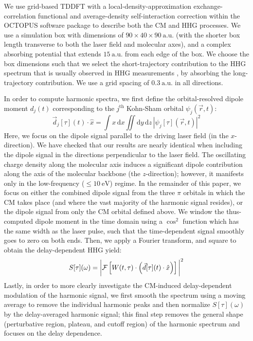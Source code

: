 \documentclass[journal=jacsat,manuscript=article]{achemso}
\begin{document}
We use grid-based TDDFT with a local-density-approximation exchange-correlation functional \cite{perdew1981, yabana1996, marques2012} and average-density self-interaction correction \cite{legrand2002, ciofini2003, tsuneda2014} within the OCTOPUS software package \cite{marques2003, castro2006, andrade2015, tancogne-dejean2020} to describe both the CM and HHG processes. We use a simulation box with dimensions of $90 \times 40 \times 90\  \text{a.u.}$ (with the shorter box length transverse to both the laser field and molecular axes), and a complex absorbing potential that extends $15\  \text{a.u.}$ from each edge of the box. We choose the box dimensions such that we select the short-trajectory contribution to the HHG spectrum that is usually observed in HHG measurements \cite{hamer2021}, by absorbing the long-trajectory contribution. We use a grid spacing of $0.3\  \text{a.u.}$ in all directions. 

In order to compute harmonic spectra, we first define the orbital-resolved dipole moment \cite{hamer2021} $d_{j}(t)$ corresponding to the $j^{\text{th}}$ Kohn-Sham orbital $\psi_{j}(\vec{r}, t)$:
\begin{equation}\label{eq:ordm}
    \vec{d}_{j}[\tau](t) \cdot \hat{x} = \int x\, \mathrm{d}x \iint \mathrm{d}y\, \mathrm{d}z\, |\psi_{j}[\tau](\vec{r}, t)|^{2}
\end{equation}
Here, we focus on the dipole signal parallel to the driving laser field (in the $x$-direction). We have checked that our results are nearly identical when including the dipole signal in the directions perpendicular to the laser field. The oscillating charge density along the molecular axis induces a significant dipole contribution along the axis of the molecular backbone (the $z$-direction); however, it manifests only in the low-frequency ($\leq 10\  \text{eV}$) regime. In the remainder of this paper, we focus on either the combined dipole signal from the three $\pi$ orbitals in which the CM takes place (and where the vast majority of the harmonic signal resides), or the dipole signal from only the CM orbital defined above. We window the thus-computed dipole moment in the time domain using a $\cos^{2}$ function which has the same width as the laser pulse, such that the time-dependent signal smoothly goes to zero on both ends. Then, we apply a Fourier transform, and square to obtain the delay-dependent HHG yield:
\begin{equation}\label{eq:fmss_spec}
    S[\tau](\omega) = \bigg{|} \mathcal{F} \left[W(t, \tau) \cdot \left(\vec{d}[\tau](t) \cdot \hat{x}\right)\right] \bigg{|}^{2}
\end{equation}
Lastly, in order to more clearly investigate the CM-induced delay-dependent modulation of the harmonic signal, we first smooth the spectrum using a moving average to remove the individual harmonic peaks and then normalize $S[\tau](\omega)$ by the delay-averaged harmonic signal; this final step removes the general shape (perturbative region, plateau, and cutoff region) of the harmonic spectrum and focuses on the delay dependence.
\end{document}
